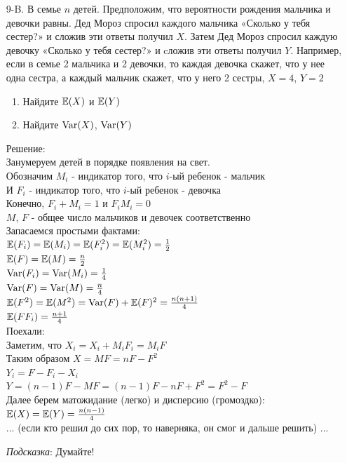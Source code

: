 \documentclass[12pt, a4paper]{article}\usepackage[]{graphicx}\usepackage[]{color}
\begin{document}
\begin{enumerate}
\item[9-B.] В семье $n$ детей. Предположим, что вероятности рождения мальчика и девочки равны. Дед Мороз спросил каждого мальчика «Сколько у тебя сестер?» и сложив эти ответы получил $X$. Затем Дед Мороз спросил каждую девочку «Сколько у тебя сестер?» и cложив эти ответы получил $Y$. Например, если в семье 2 мальчика и 2 девочки, то каждая девочка скажет, что у нее одна сестра, а каждый мальчик скажет, что у него 2 сестры, $X=4$, $Y=2$
\begin{enumerate}
\item Найдите $\mathbb{E}(X)$ и $\mathbb{E}(Y)$
\item Найдите $\operatorname{Var}(X)$, $\operatorname{Var}(Y)$
\end{enumerate}
Решение: \\
Занумеруем детей в порядке появления на свет. \\
Обозначим $M_{i}$ - индикатор того, что $i$-ый ребенок - мальчик \\
И $F_{i}$ - индикатор того, что $i$-ый ребенок - девочка \\
Конечно, $F_{i}+M_{i}=1$ и $F_{i}M_{i}=0$ \\
$M$, $F$ - общее число мальчиков и девочек соответственно \\
Запасаемся простыми фактами: \\
$\mathbb{E}(F_{i})=\mathbb{E}(M_{i})=\mathbb{E}(F_{i}^{2})=\mathbb{E}(M_{i}^{2})=\frac{1}{2}$ \\
$\mathbb{E}(F)=\mathbb{E}(M)=\frac{n}{2}$ \\
$\operatorname{Var}(F_{i})=\operatorname{Var}(M_{i})=\frac{1}{4}$ \\
$\operatorname{Var}(F)=\operatorname{Var}(M)=\frac{n}{4}$ \\
$\mathbb{E}(F^{2})=\mathbb{E}(M^{2})=\operatorname{Var}(F)+\mathbb{E}(F)^{2}=\frac{n(n+1)}{4}$ \\
$\mathbb{E}(FF_{i})=\frac{n+1}{4}$ \\
Поехали: \\
Заметим, что $X_{i}=X_{i}+M_{i}F_{i}=M_{i}F$ \\
Таким образом $X=MF=nF-F^{2}$ \\
$Y_{i}=F-F_{i}-X_{i}$ \\
$Y=(n-1)F-MF=(n-1)F-nF+F^{2}=F^{2}-F$ \\
Далее берем матожидание (легко) и дисперсию (громоздко): \\
$\mathbb{E}(X)=\mathbb{E}(Y)=\frac{n(n-1)}{4}$ \\
... (если кто решил до сих пор, то наверняка, он смог и дальше решить) ...

\emph{Подсказка}: Думайте!

\end{enumerate}
\end{document}
